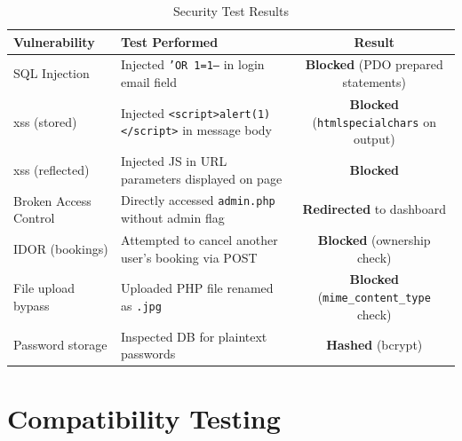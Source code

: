 \documentclass[12pt,a4paper,openright]{report}
\begin{document}
\begin{table}[H]
\centering
\caption{Security Test Results}
\label{tab:security-tests}
\begin{tabularx}{\textwidth}{l X c}
\toprule
\textbf{Vulnerability} & \textbf{Test Performed} & \textbf{Result} \\
\midrule
SQL Injection & Injected \texttt{'OR 1=1--} in login email field & \textcolor{green!70!black}{\textbf{Blocked}} (PDO prepared statements) \\
\gls{xss} (stored) & Injected \texttt{<script>alert(1)</script>} in message body & \textcolor{green!70!black}{\textbf{Blocked}} (\texttt{htmlspecialchars} on output) \\
\gls{xss} (reflected) & Injected JS in URL parameters displayed on page & \textcolor{green!70!black}{\textbf{Blocked}} \\
Broken Access Control & Directly accessed \texttt{admin.php} without admin flag & \textcolor{green!70!black}{\textbf{Redirected}} to dashboard \\
IDOR (bookings) & Attempted to cancel another user's booking via POST & \textcolor{green!70!black}{\textbf{Blocked}} (ownership check) \\
File upload bypass & Uploaded PHP file renamed as \texttt{.jpg} & \textcolor{green!70!black}{\textbf{Blocked}} (\texttt{mime\_content\_type} check) \\
Password storage & Inspected DB for plaintext passwords & \textcolor{green!70!black}{\textbf{Hashed}} (bcrypt) \\
\bottomrule
\end{tabularx}
\end{table}

\section{Compatibility Testing}
\end{document}

